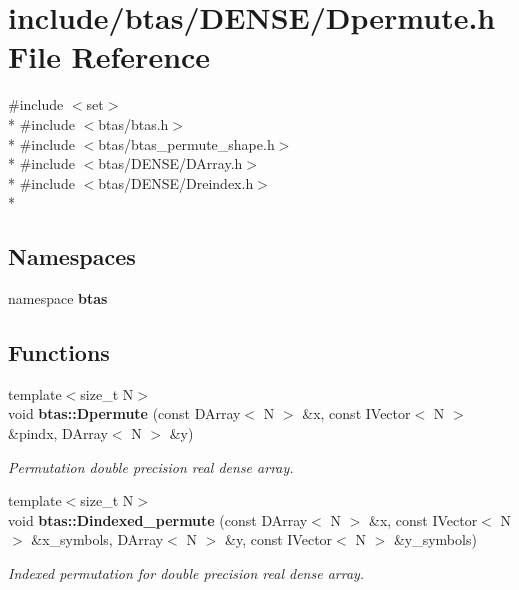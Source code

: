 \section{include/btas/\-D\-E\-N\-S\-E/\-Dpermute.h File Reference}
\label{d2/d18/Dpermute_8h}
{\ttfamily \#include $<$set$>$}\\*
{\ttfamily \#include $<$btas/btas.\-h$>$}\\*
{\ttfamily \#include $<$btas/btas\-\_\-permute\-\_\-shape.\-h$>$}\\*
{\ttfamily \#include $<$btas/\-D\-E\-N\-S\-E/\-D\-Array.\-h$>$}\\*
{\ttfamily \#include $<$btas/\-D\-E\-N\-S\-E/\-Dreindex.\-h$>$}\\*
\subsection*{Namespaces}
\begin{DoxyCompactItemize}
\item 
namespace {\bf btas}
\end{DoxyCompactItemize}
\subsection*{Functions}
\begin{DoxyCompactItemize}
\item 
{\footnotesize template$<$size\-\_\-t N$>$ }\\void {\bf btas\-::\-Dpermute} (const D\-Array$<$ N $>$ \&x, const I\-Vector$<$ N $>$ \&pindx, D\-Array$<$ N $>$ \&y)
\begin{DoxyCompactList}\small\item\em Permutation double precision real dense array. \end{DoxyCompactList}\item 
{\footnotesize template$<$size\-\_\-t N$>$ }\\void {\bf btas\-::\-Dindexed\-\_\-permute} (const D\-Array$<$ N $>$ \&x, const I\-Vector$<$ N $>$ \&x\-\_\-symbols, D\-Array$<$ N $>$ \&y, const I\-Vector$<$ N $>$ \&y\-\_\-symbols)
\begin{DoxyCompactList}\small\item\em Indexed permutation for double precision real dense array. \end{DoxyCompactList}\end{DoxyCompactItemize}
